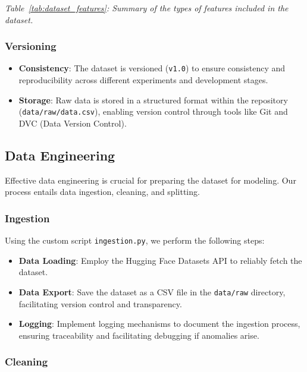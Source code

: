 \documentclass{article}
\begin{document}
\textit{Table~\ref{tab:dataset_features}: Summary of the types of features included in the dataset.}

\subsubsection{Versioning}

\begin{itemize}[leftmargin=*]
    \item \textbf{Consistency}: The dataset is versioned (\texttt{v1.0}) to ensure consistency and reproducibility across different experiments and development stages.
    \item \textbf{Storage}: Raw data is stored in a structured format within the repository (\texttt{data/raw/data.csv}), enabling version control through tools like Git and DVC (Data Version Control).
\end{itemize}

\subsection{Data Engineering}

Effective data engineering is crucial for preparing the dataset for modeling. Our process entails data ingestion, cleaning, and splitting.

\subsubsection{Ingestion}

Using the custom script \texttt{ingestion.py}, we perform the following steps:

\begin{itemize}[leftmargin=*]
    \item \textbf{Data Loading}: Employ the Hugging Face Datasets API to reliably fetch the dataset.
    \item \textbf{Data Export}: Save the dataset as a CSV file in the \texttt{data/raw} directory, facilitating version control and transparency.
    \item \textbf{Logging}: Implement logging mechanisms to document the ingestion process, ensuring traceability and facilitating debugging if anomalies arise.
\end{itemize}

\subsubsection{Cleaning}
\end{document}
